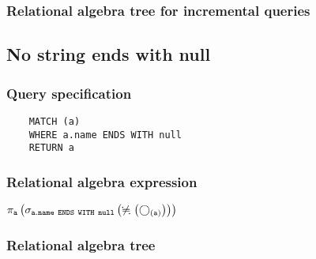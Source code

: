 	\subsubsection*{Relational algebra tree for incremental queries}

	\subsection{No string ends with null}

	\subsubsection*{Query specification}

	\begin{lstlisting}
	MATCH (a)
	WHERE a.name ENDS WITH null
	RETURN a
	\end{lstlisting}


	\subsubsection*{Relational algebra expression}

	$\projection{\var{a}} \left(\selection{\mathtt{a.name~ENDS~WITH~null}} \left(\alldifferent{} \left(\getvertices{a}{}\right)\right)\right)$

	\subsubsection*{Relational algebra tree}


